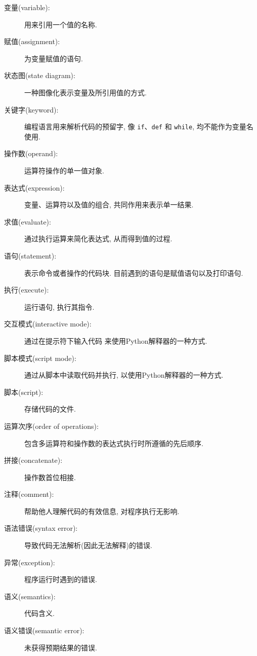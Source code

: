 \documentclass[10pt]{book}
\begin{document}
\begin{description}

\item[变量(variable):]  用来引用一个值的名称. 

\item[赋值(assignment):] 为变量赋值的语句. 

\item[状态图(state diagram):] 一种图像化表示变量及所引用值的方式. 

\item[关键字(keyword):] 编程语言用来解析代码的预留字, 像 {\tt if}、{\tt  def} 和 {\tt while}, 
均不能作为变量名使用. 

\item[操作数(operand):] 运算符操作的单一值对象. 

\item[表达式(expression):] 变量、运算符以及值的组合, 
共同作用来表示单一结果. 

\item[求值(evaluate):] 通过执行运算来简化表达式, 从而得到值的过程. 

\item[语句(statement):] 表示命令或者操作的代码块. 目前遇到的语句是赋值语句以及打印语句. 

\item[执行(execute):] 运行语句, 执行其指令.

\item[交互模式(interactive mode):] 通过在提示符下输入代码
来使用Python解释器的一种方式. 

\item[脚本模式(script mode):] 通过从脚本中读取代码并执行, 
以使用Python解释器的一种方式. 

\item[脚本(script):] 存储代码的文件. 

\item[运算次序(order of operations):]  包含多运算符和操作数的表达式执行时所遵循的先后顺序. 

\item[拼接(concatenate):] 操作数首位相接. 

\item[注释(comment):] 帮助他人理解代码的有效信息, 对程序执行无影响. 

\item[语法错误(syntax error):] 导致代码无法解析(因此无法解释)的错误. 

\item[异常(exception):] 程序运行时遇到的错误. 

\item[语义(semantics):] 代码含义. 

\item[语义错误(semantic error):] 未获得预期结果的错误. 

\end{description}
\end{document}
